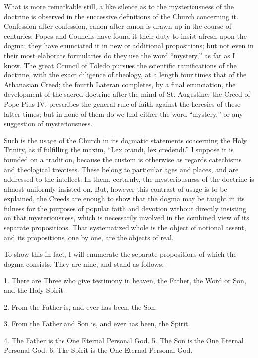 What is more remarkable still, a like silence as to the
mysteriousness of the doctrine is observed in the successive
definitions of the Church concerning it. Confession after confession,
canon after canon is drawn up in the course of centuries; Popes and
Councils have found it their duty to insist afresh upon the dogma;
they have enunciated it in new or additional propositions; but not
even in their most elaborate formularies do they use the word
``mystery,'' as far as I know. The great Council of Toledo
pursues the scientific ramifications of the doctrine, with the exact
diligence of theology, at a length four times that of the Athanasian
Creed; the fourth Lateran completes, by a final enunciation, the
development of the sacred doctrine after the mind of St. Augustine;
the Creed of Pope Pius IV. prescribes the general rule of faith
against the heresies of these latter times; but in none of them do we
find either the word ``mystery,'' or any suggestion of
mysteriousness.

Such is the usage of the Church in its dogmatic statements
concerning the Holy Trinity, as if fulfilling the maxim, ``Lex
orandi, lex credendi.'' I suppose it is founded on a tradition,
because the custom is otherwise as regards catechisms and theological
treatises. These belong to particular ages and places, and are
addressed to the intellect. In them, certainly, the mysteriousness of
the doctrine is almost uniformly insisted on. But, however this
contrast of usage is to be explained, the Creeds are enough to
show that the dogma may be taught in its fulness for the purposes of
popular faith and devotion without directly insisting on that
mysteriousness, which is necessarily involved in the combined view of
its separate propositions. That systematized whole is the object of
notional assent, and its propositions, one by one, are the objects of
real.

To show this in fact, I will enumerate the separate propositions of
which the dogma consists. They are nine, and stand as follows:—

1. There are Three who give testimony in heaven, the Father, the
Word or Son, and the Holy Spirit.

2. From the Father is, and ever has been, the Son.

3. From the Father and Son is, and ever has been, the Spirit.

4. The Father is the One Eternal Personal God. 5. The Son is the
One Eternal Personal God. 6. The Spirit is the One Eternal Personal
God.

